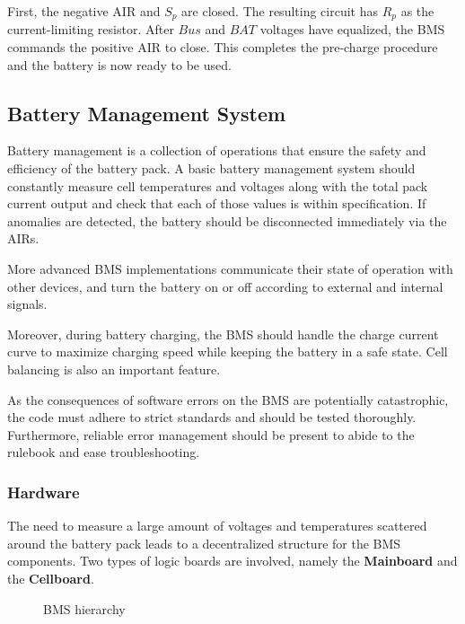 First, the negative AIR and $S_p$ are closed. The resulting circuit has $R_p$ as the current-limiting resistor. After $Bus$ and $BAT$ voltages have equalized, the BMS commands the positive AIR to close. This completes the pre-charge procedure and the battery is now ready to be used.

\subsection{Battery Management System}
Battery management is a collection of operations that ensure the safety and efficiency of the battery pack. A basic battery management system should constantly measure cell temperatures and voltages along with the total pack current output and check that each of those values is within specification. If anomalies are detected, the battery should be disconnected immediately via the AIRs.
%    

More advanced BMS implementations communicate their state of operation with other devices, and turn the battery on or off according to external and internal signals.

Moreover, during battery charging, the BMS should handle the charge current curve to maximize charging speed while keeping the battery in a safe state. Cell balancing is also an important feature.

As the consequences of software errors on the BMS are potentially catastrophic, the code must adhere to strict standards and should be tested thoroughly. Furthermore, reliable error management should be present to abide to the rulebook and ease troubleshooting.

\subsubsection{Hardware}
The need to measure a large amount of voltages and temperatures scattered around the battery pack leads to a decentralized structure for the BMS components. Two types of logic boards are involved, namely the \textbf{Mainboard} and the \textbf{Cellboard}.

\begin{figure}[h]
    \centering
    
    \caption{BMS hierarchy}
    \label{fig:bms_hierarchy}
\end{figure}

